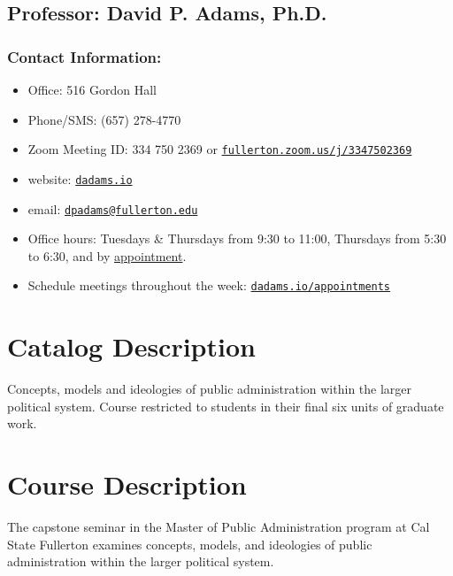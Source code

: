 \documentclass[11pt, letterpaper]{article}
\begin{document}
                    \subsection*{Professor: David P. Adams, Ph.D.}

                    \subsubsection*{Contact Information:}
                    
                    \begin{itemize}
                            \item Office: 516 Gordon Hall
                            \item Phone/SMS: (657) 278-4770
                            \item Zoom Meeting ID: 334 750 2369 or \href{https://fullerton.zoom.us/j/3347502369}{\texttt{fullerton.zoom.us/j/3347502369}} 
                            \item website: \href{https://dadams.io}{\texttt{dadams.io}}
                            \item email: \href{dpadams@fullerton.edu}{\texttt{dpadams@fullerton.edu}}
                            \item Office hours: Tuesdays \& Thursdays from 9:30 to 11:00, Thursdays from 5:30 to 6:30, and by \href{https://dadams.io/appointments}{appointment}.
                            \item Schedule meetings throughout the week: \href{https://dadams.io/appointments}{\texttt{dadams.io/appointments}}
                    \end{itemize}
                    
                    \section{Catalog Description}
                    Concepts, models and ideologies of public administration within the larger political system. Course restricted to students in their final six units of graduate work.
                    
                    \section{Course Description}
                    The capstone seminar in the Master of Public Administration program at Cal State Fullerton examines concepts, models, and ideologies of public administration within the larger political system.
\end{document}

